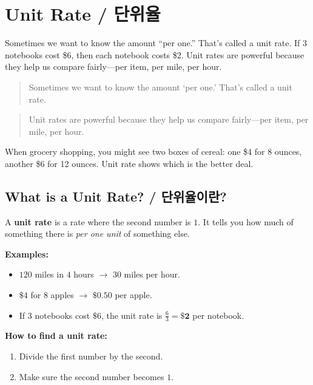 \newpage
\section{Unit Rate / 단위율}

Sometimes we want to know the amount ``per one.'' That's called a unit rate. If 3
notebooks cost \$6, then each notebook costs \$2. Unit rates are powerful because
they help us compare fairly—per item, per mile, per hour.

\blockquote{Sometimes we want to know the amount ‘per one.’ That’s called a unit rate.}  


\blockquote{}

\blockquote{Unit rates are powerful because they help us compare fairly—per item, per mile, per hour.}  


\blockquote{}

When grocery shopping, you might see two boxes of cereal: one \$4 for 8 ounces,
another \$6 for 12 ounces. Unit rate shows which is the better deal.

\subsection{What is a Unit Rate? / 단위율이란?}

A \textbf{unit rate} is a rate where the second number is \(1\). It tells you how
much of something there is \emph{per one unit} of something else.

\textbf{Examples:}
\begin{itemize}
  \item \(120\) miles in \(4\) hours \(\rightarrow\) \(30\) miles per hour.
  \item \(\$4\) for \(8\) apples \(\rightarrow\) \(\$0.50\) per apple.
  \item If \(3\) notebooks cost \(\$6\), the unit rate is \(\displaystyle \frac{6}{3} = \mathbf{\$2}\) per notebook.
\end{itemize}

\textbf{How to find a unit rate:}
\begin{enumerate}
  \item Divide the first number by the second.
  \item Make sure the second number becomes \(1\).
\end{enumerate}

